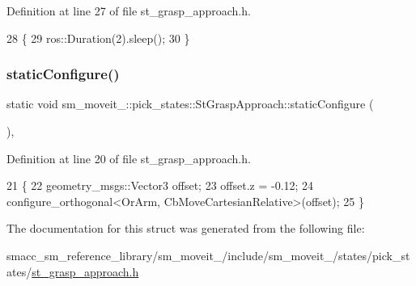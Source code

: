 Definition at line 27 of file st\+\_\+grasp\+\_\+approach.\+h.


\begin{DoxyCode}
28     \{
29         ros::Duration(2).sleep();
30     \}
\end{DoxyCode}
\mbox{\label{structsm__moveit__4_1_1pick__states_1_1StGraspApproach_af561cae9fd41e10797391012ae7ad361}} 
\subsubsection{\texorpdfstring{static\+Configure()}{staticConfigure()}}
{\footnotesize\ttfamily static void sm\+\_\+moveit\+\_\+::pick\+\_\+states\+::\+St\+Grasp\+Approach\+::static\+Configure (\begin{DoxyParamCaption}{ }\end{DoxyParamCaption})\hspace{0.3cm}{\ttfamily [inline]}, {\ttfamily [static]}}



Definition at line 20 of file st\+\_\+grasp\+\_\+approach.\+h.


\begin{DoxyCode}
21     \{
22         geometry\_msgs::Vector3 offset;
23         offset.z = -0.12;
24         configure\_orthogonal<OrArm, CbMoveCartesianRelative>(offset);
25     \}
\end{DoxyCode}


The documentation for this struct was generated from the following file\+:\begin{DoxyCompactItemize}
\item 
smacc\+\_\+sm\+\_\+reference\+\_\+library/sm\+\_\+moveit\+\_/include/sm\+\_\+moveit\+\_/states/pick\+\_\+states/\hyperlink{4_2include_2sm__moveit__4_2states_2pick__states_2st__grasp__approach_8h}{st\+\_\+grasp\+\_\+approach.\+h}\end{DoxyCompactItemize}
